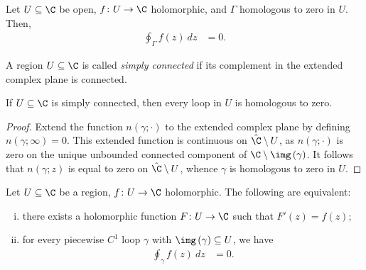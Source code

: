 \documentclass[10pt]{mypackage}
\begin{document}
\begin{theorem}
  Let $U\subseteq \C$ be open, $f\colon U\rightarrow \C$ holomorphic, and $\Gamma$ homologous to zero in $U$. Then,
  \begin{align*}
    \oint_{\Gamma}^{} f(z)\:dz &= 0.
  \end{align*}
\end{theorem}
\begin{definition}
  A region $U\subseteq \C$ is called \textit{simply connected} if its complement in the extended complex plane is connected.
\end{definition}
\begin{theorem}
  If $U\subseteq \C$ is simply connected, then every loop in $U$ is homologous to zero.
\end{theorem}
\begin{proof}
  Extend the function $n\left( \gamma;\cdot \right)$ to the extended complex plane by defining $n\left( \gamma;\infty \right) = 0$. This extended function is continuous on $\hat{\C}\setminus U$, as $n\left( \gamma;\cdot \right)$ is zero on the unique unbounded connected component of $\C\setminus \img\left( \gamma \right)$. It follows that $n\left( \gamma;z \right)$ is equal to zero on $\hat{\C}\setminus U$, whence $\gamma$ is homologous to zero in $U$.
\end{proof}
\begin{proposition}
  Let $U\subseteq \C$ be a region, $f\colon U\rightarrow \C$ holomorphic. The following are equivalent:
  \begin{enumerate}[(i)]
    \item there exists a holomorphic function $F\colon U\rightarrow \C$ such that $F'(z) = f(z)$;
    \item for every piecewise $C^{1}$ loop $\gamma$ with $\img\left( \gamma \right)\subseteq U$, we have
      \begin{align*}
        \oint_{\gamma}^{} f(z)\:dz &= 0.
      \end{align*}
  \end{enumerate}
\end{proposition}
\end{document}
